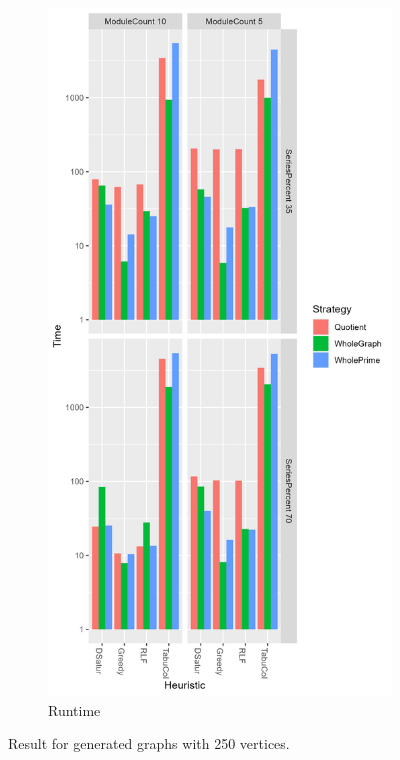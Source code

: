 \documentclass[a4paper]{article}
\begin{document}
\begin{figure}[p]
\begin{subfigure}{.4\paperwidth}
    \end{subfigure}%
    \begin{subfigure}{.4\paperwidth}
        \includegraphics[width=\columnwidth]{Tables/250Time.png}
      \caption{Runtime}
      \label{fig:250t}
    \end{subfigure}
\caption{Result for generated graphs with 250 vertices. \facfigdesc}
\label{fig:250}
\end{figure}
\end{document}
